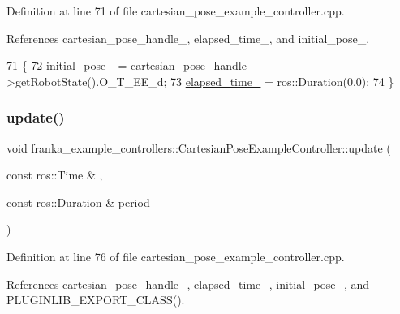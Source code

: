 Definition at line 71 of file cartesian\+\_\+pose\+\_\+example\+\_\+controller.\+cpp.



References cartesian\+\_\+pose\+\_\+handle\+\_\+, elapsed\+\_\+time\+\_\+, and initial\+\_\+pose\+\_\+.


\begin{DoxyCode}
71                                                               \{
72   \hyperlink{classfranka__example__controllers_1_1CartesianPoseExampleController_a43c4db7364e30dbbb5fa64e6457d639e}{initial\_pose\_} = \hyperlink{classfranka__example__controllers_1_1CartesianPoseExampleController_a23b7a3e97178593a7ae854f6c513ede7}{cartesian\_pose\_handle\_}->getRobotState().O\_T\_EE\_d;
73   \hyperlink{classfranka__example__controllers_1_1CartesianPoseExampleController_ab671f506567721b65a9607a216cf4a47}{elapsed\_time\_} = ros::Duration(0.0);
74 \}
\end{DoxyCode}
\mbox{\label{classfranka__example__controllers_1_1CartesianPoseExampleController_aaecae953c1aeeaa8d08b569f0ef4723d}} 
\subsubsection{\texorpdfstring{update()}{update()}}
{\footnotesize\ttfamily void franka\+\_\+example\+\_\+controllers\+::\+Cartesian\+Pose\+Example\+Controller\+::update (\begin{DoxyParamCaption}\item[{const ros\+::\+Time \&}]{,  }\item[{const ros\+::\+Duration \&}]{period }\end{DoxyParamCaption})\hspace{0.3cm}{\ttfamily [override]}}



Definition at line 76 of file cartesian\+\_\+pose\+\_\+example\+\_\+controller.\+cpp.



References cartesian\+\_\+pose\+\_\+handle\+\_\+, elapsed\+\_\+time\+\_\+, initial\+\_\+pose\+\_\+, and P\+L\+U\+G\+I\+N\+L\+I\+B\+\_\+\+E\+X\+P\+O\+R\+T\+\_\+\+C\+L\+A\+S\+S().


